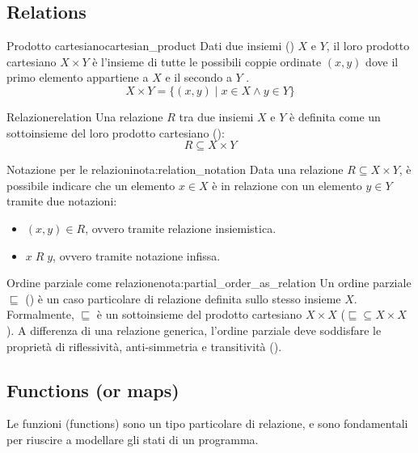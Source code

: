 \subsection{Relations}

\begin{definizione}{Prodotto cartesiano}{cartesian_product}
Dati due insiemi () $X$ e $Y$, il loro prodotto cartesiano $X \times Y$ è
l'insieme di tutte le possibili coppie ordinate $(x, y)$ dove il primo
elemento appartiene a $X$ e il secondo a $Y$ .
\[
X \times Y = \{ (x, y) \mid x \in X \land y \in Y \}
\]
\end{definizione}

\begin{definizione}{Relazione}{relation}
Una relazione $R$ tra due insiemi $X$ e $Y$ è definita come un sottoinsieme
del loro prodotto cartesiano ():
\[
R \subseteq X \times Y
\]
\end{definizione}

\begin{nota}{Notazione per le relazioni}{nota:relation_notation}
Data una relazione $R \subseteq X \times Y$, è possibile indicare che
un elemento $x \in X$ è in relazione con un elemento $y \in Y$ tramite due
notazioni:
\begin{itemize}
    \item $(x, y) \in R$, ovvero tramite relazione insiemistica.
    \item $x \; R \; y$, ovvero tramite notazione infissa.
\end{itemize}

\end{nota}

\begin{nota}{Ordine parziale come relazione}{nota:partial_order_as_relation}
Un ordine parziale $\sqsubseteq$ () è un caso
particolare di relazione definita sullo stesso insieme $X$.
Formalmente, $\sqsubseteq$ è un sottoinsieme del prodotto cartesiano
$X \times X$ ($\sqsubseteq \subseteq X \times X$).
A differenza di una relazione generica, l'ordine parziale deve soddisfare le
proprietà di riflessività, anti-simmetria e transitività ().
\end{nota}

\subsection{Functions (or maps)}

Le funzioni (functions) sono un tipo particolare di relazione, e sono
fondamentali per riuscire a modellare gli stati di un programma.

